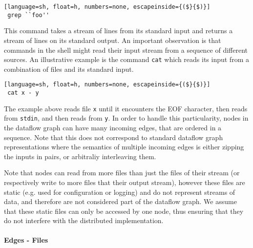 \documentclass[sigplan,10pt,review,anonymous]{acmart}
\newcommand{\ttt}[1]{\texttt{\small #1}}
\newcommand{\TODO}[1]{\hl{\textbf{TODO:} #1}\xspace}
\begin{document}
\begin{lstlisting}[language=sh, float=h, numbers=none, escapeinside={($}{$)}]
 grep ``foo''
\end{lstlisting}

\noindent
This command takes a stream of lines from its standard input and
returns a stream of lines on its standard output. An important
observation is that commands in the shell might read their input
stream from a sequence of different sources. An illustrative example
is the command \ttt{cat} which reads its input from a combination
of files and its standard input.

\begin{lstlisting}[language=sh, float=h, numbers=none, escapeinside={($}{$)}]
 cat x - y
\end{lstlisting}

The example above reads file \ttt{x} until it encounters the EOF
character, then reads from \ttt{stdin}, and then reads from
\ttt{y}. In order to handle this particularity, nodes in the
dataflow graph can have many incoming edges, that are ordered in a
sequence. Note that this does not correspond to standard dataflow
graph representations where the semantics of multiple incoming edges
is either zipping the inputs in pairs, or arbitraliy interleaving them.


Note that nodes can read from more files than just the files of their
stream (or respectively write to more files that their output stream),
however these files are static (e.g. used for configuration or
logging) and do not represent streams of data, and therefore are not
considered part of the dataflow graph. We assume that these static
files can only be accessed by one node, thus ensuring that they do not
interfere with the distributed implementation.

\paragraph{Edges - Files}
\end{document}
